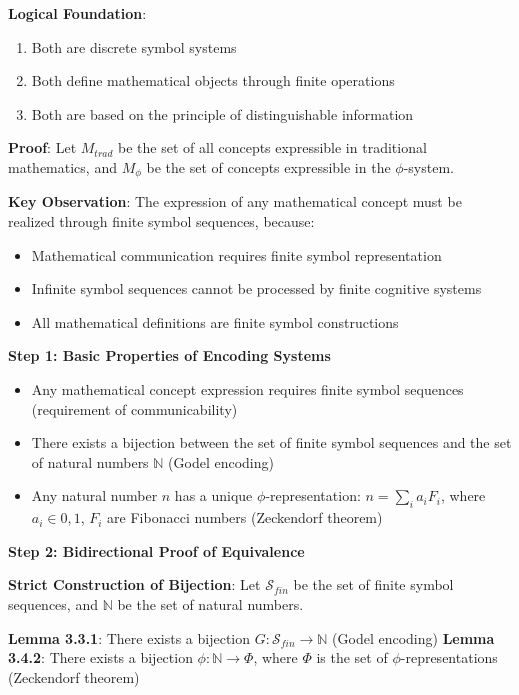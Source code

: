 \textbf{Logical Foundation}:
\begin{enumerate}
\item Both are discrete symbol systems
\item Both define mathematical objects through finite operations
\item Both are based on the principle of distinguishable information
\end{enumerate}

\textbf{Proof}:
Let $M_{trad}$ be the set of all concepts expressible in traditional mathematics, and $M_\phi$ be the set of concepts expressible in the $\phi$-system.

\textbf{Key Observation}: The expression of any mathematical concept must be realized through finite symbol sequences, because:
\begin{itemize}
\item Mathematical communication requires finite symbol representation
\item Infinite symbol sequences cannot be processed by finite cognitive systems
\item All mathematical definitions are finite symbol constructions
\end{itemize}

\textbf{Step 1: Basic Properties of Encoding Systems}
\begin{itemize}
\item Any mathematical concept expression requires finite symbol sequences (requirement of communicability)
\item There exists a bijection between the set of finite symbol sequences and the set of natural numbers $\mathbb{N}$ (Godel encoding)
\item Any natural number $n$ has a unique $\phi$-representation: $n = \sum_{i} a_i F_i$, where $a_i \in {0,1}$, $F_i$ are Fibonacci numbers (Zeckendorf theorem)
\end{itemize}

\textbf{Step 2: Bidirectional Proof of Equivalence}

\textbf{Strict Construction of Bijection}:
Let $\mathcal{S}_{fin}$ be the set of finite symbol sequences, and $\mathbb{N}$ be the set of natural numbers.

\textbf{Lemma 3.3.1}: There exists a bijection $G: \mathcal{S}_{fin} \to \mathbb{N}$ (Godel encoding)
\label{thm:1.3}
\textbf{Lemma 3.4.2}: There exists a bijection $\phi: \mathbb{N} \to \Phi$, where $\Phi$ is the set of $\phi$-representations (Zeckendorf theorem)
\label{thm:1.3}

